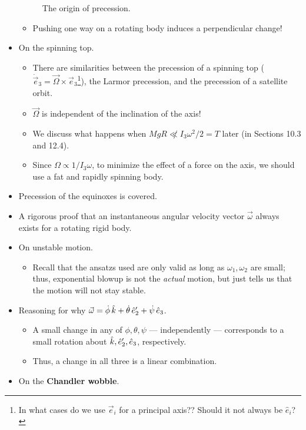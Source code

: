 \documentclass[../notes.tex]{subfiles}
\begin{document}
\begin{itemize}
\begin{figure}[H]
        \caption{The origin of precession.}
        \label{fig:precession}
    \end{figure}
    \begin{itemize}
        \item Pushing one way on a rotating body induces a perpendicular change!
    \end{itemize}
    \item On the spinning top.
    \begin{itemize}
        \item There are similarities between the precession of a spinning top ($\dot{\vec{e}}_3=\vec{\Omega}\times\vec{e}_3$\footnote{In what cases do we use $\vec{e}_i$ for a principal axis?? Should it not always be $\hat{e}_i$?}), the Larmor precession, and the precession of a satellite orbit.
        \item $\vec{\Omega}$ is independent of the inclination of the axis!
        \item We discuss what happens when $MgR\not\ll I_3\omega^2/2=T$ later (in Sections 10.3 and 12.4).
        \item Since $\Omega\propto1/I_3\omega$, to minimize the effect of a force on the axis, we should use a fat and rapidly spinning body.
    \end{itemize}
    \item Precession of the equinoxes is covered.
    \item A rigorous proof that an instantaneous angular velocity vector $\vec{\omega}$ always exists for a rotating rigid body.
    \item On unstable motion.
    \begin{itemize}
        \item Recall that the ansatzs used are only valid as long as $\omega_1,\omega_2$ are small; thus, exponential blowup is not the \emph{actual} motion, but just tells us that the motion will not stay stable.
    \end{itemize}
    \item Reasoning for why $\vec{\omega}=\dot{\phi}\,\hat{k}+\dot{\theta}\,\hat{e}_2'+\dot{\psi}\,\hat{e}_3$.
    \begin{itemize}
        \item A small change in any of $\phi,\theta,\psi$ --- independently --- corresponds to a small rotation about $\hat{k},\hat{e}_2',\hat{e}_3$, respectively.
        \item Thus, a change in all three is a linear combination.
    \end{itemize}
    \item On the \textbf{Chandler wobble}.
\end{itemize}
\end{document}
